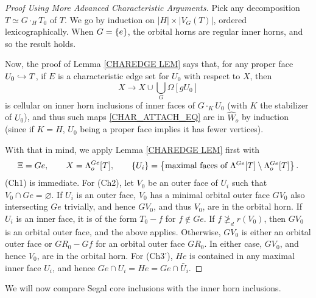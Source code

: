 \documentclass[a4paper,10pt,draft]{article}%
\begin{document}
\begin{proof}[Proof Using More Advanced Characteristic Arguments]
      Pick any decomposition $T \simeq G \cdot_H T_0$ of $T$.
      We go by induction on $|H| \times |V_G(T)|$, ordered lexicographically. 
      When $G = \left\{e\right\}$, the orbital horns are regular inner horns, and so the result holds.

      Now, the proof of Lemma \ref{CHAREDGE LEM}
      says that,
      for any proper face $U_0 \hookrightarrow T$,
      if $E$ is a characteristic edge set for $U_0$ with respect to $X$, then
      \begin{equation}
            \label{CHAR_ATTACH_EQ}
            X \to X \cup \mathop{\bigcup}\limits_G \Omega[g U_0]
      \end{equation}
      is cellular on inner horn inclusions of inner faces of $G \cdot_K U_0$ (with $K$ the stabilizer of $U_0$),
      and thus such maps \eqref{CHAR_ATTACH_EQ} are in $\hat{W}_o$ by induction
      (since if $K = H$, $U_0$ being a proper face implies it has fewer vertices).

      With that in mind, we apply Lemma \ref{CHAREDGE LEM} first with
      \begin{equation}
            \Xi = G e,
            \qquad X = \Lambda^{G e}_o[T],
            \qquad \left\{U_i\right\} = \left\{\mbox{maximal faces of $\Lambda^{G e}[T] \setminus \Lambda^{G e}_o[T]$}\right\}.
      \end{equation}
      (Ch1) is immediate.
      For (Ch2), let $V_0$ be an outer face of $U_i$ such that $V_0 \cap G e = \varnothing$.
      If $U_i$ is an outer face,
      $V_0$ has a minimal orbital outer face $G V_0$ also intersecting $G e$ trivially,
      and hence $G V_0$, and thus $V_0$, are in the orbital horn.
      If $U_i$ is an inner face, it is of the form $T_0 - f$ for $f \notin G e$.
      If $f \not \geq_d r(V_0)$, then $G V_0$ is an orbital outer face, and the above applies.
      Otherwise, $G V_0$ is either an orbital outer face or $G R_0 - G f$ for an orbital outer face $G R_0$.
      In either case, $G V_0$, and hence $V_0$, are in the orbital horn.
      For (Ch3'), $H e$ is contained in any maximal inner face $U_i$, and hence
      $G e \cap U_i = H e = G e \cap \bar U_i$.
\end{proof}


We will now compare Segal core inclusions with the inner horn inclusions.
\end{document}
